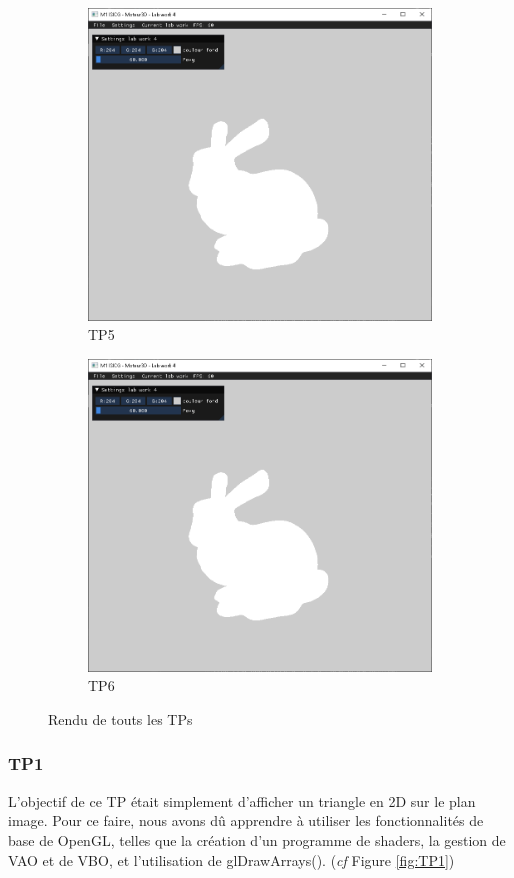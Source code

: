 \documentclass[10pt,a4paper]{article}
\begin{document}
\begin{figure}[!ht]
\begin{subfigure}[b]{0.32\textwidth}
					\centering
					\includegraphics[width=.9\textwidth]{figures/TP5.png}
					\caption{TP5}\label{fig:TP5}
				\end{subfigure}
				\hfill
				\begin{subfigure}[b]{0.32\textwidth}
					\centering
					\includegraphics[width=.9\textwidth]{figures/TP6.png}
					\caption{TP6}\label{fig:TP6}
				\end{subfigure}
				\caption{Rendu de touts les TPs}\label{fig:TPs}
			\end{figure}
		
			\subsubsection{TP1}
				L'objectif de ce TP était simplement d'afficher un triangle en 2D sur le plan image. Pour ce faire, nous avons dû apprendre à utiliser les fonctionnalités de base de OpenGL, telles que la création d'un programme de shaders, la gestion de VAO et de VBO, et l'utilisation de glDrawArrays().  (\textit{cf} Figure \ref{fig:TP1})
			
\end{document}
